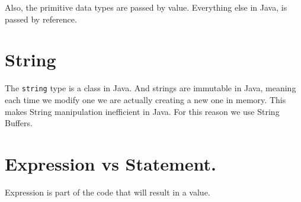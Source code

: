 \documentclass[11pt,twoside,a4paper]{report}
\begin{document}
        Also, the primitive data types are passed by value. Everything else in Java, is passed by reference.
        
    \section{String}
        The \verb|string| type is a class in Java. And strings are immutable in Java, meaning each time we modify one we are actually creating a new one in memory.
        This makes String manipulation inefficient in Java. For this reason we use String Buffers.
        
    \section{Expression vs Statement.}
        Expression is part of the code that will result in a value.
\end{document}

